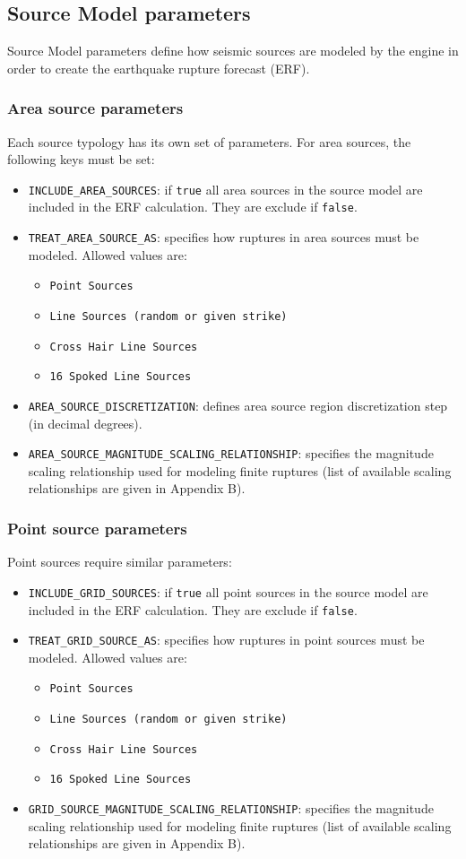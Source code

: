 \subsection{Source Model parameters}
Source Model parameters define how seismic sources are modeled by the engine in order to create the earthquake rupture forecast (ERF).\\
\subsubsection{Area source parameters}
Each source typology has its own set of parameters. For area sources, the following keys must be set:
\begin{itemize}
\item \Verb+INCLUDE_AREA_SOURCES+: if \Verb+true+ all area sources in the source model are included in the ERF calculation. They are exclude if \Verb+false+.
\item \Verb+TREAT_AREA_SOURCE_AS+: specifies how ruptures in area sources must be modeled. Allowed values are:
\begin{itemize}
\item \Verb+Point Sources+
\item \Verb+Line Sources (random or given strike)+
\item \Verb+Cross Hair Line Sources+
\item \Verb+16 Spoked Line Sources+
\end{itemize}
\item \Verb+AREA_SOURCE_DISCRETIZATION+: defines area source region discretization step (in decimal degrees).
\item \Verb+AREA_SOURCE_MAGNITUDE_SCALING_RELATIONSHIP+: specifies the magnitude scaling relationship used for modeling finite ruptures (list of available scaling relationships are given in Appendix B).
\end{itemize}

\subsubsection{Point source parameters}
Point sources require similar parameters:
\begin{itemize}
\item \Verb+INCLUDE_GRID_SOURCES+: if \Verb+true+ all point sources in the source model are included in the ERF calculation. They are exclude if \Verb+false+.
\item \Verb+TREAT_GRID_SOURCE_AS+: specifies how ruptures in point sources must be modeled. Allowed values are:
\begin{itemize}
\item \Verb+Point Sources+
\item \Verb+Line Sources (random or given strike)+
\item \Verb+Cross Hair Line Sources+
\item \Verb+16 Spoked Line Sources+
\end{itemize}
\item \Verb+GRID_SOURCE_MAGNITUDE_SCALING_RELATIONSHIP+: specifies the magnitude scaling relationship used for modeling finite ruptures (list of available scaling relationships are given in Appendix B).
\end{itemize}

